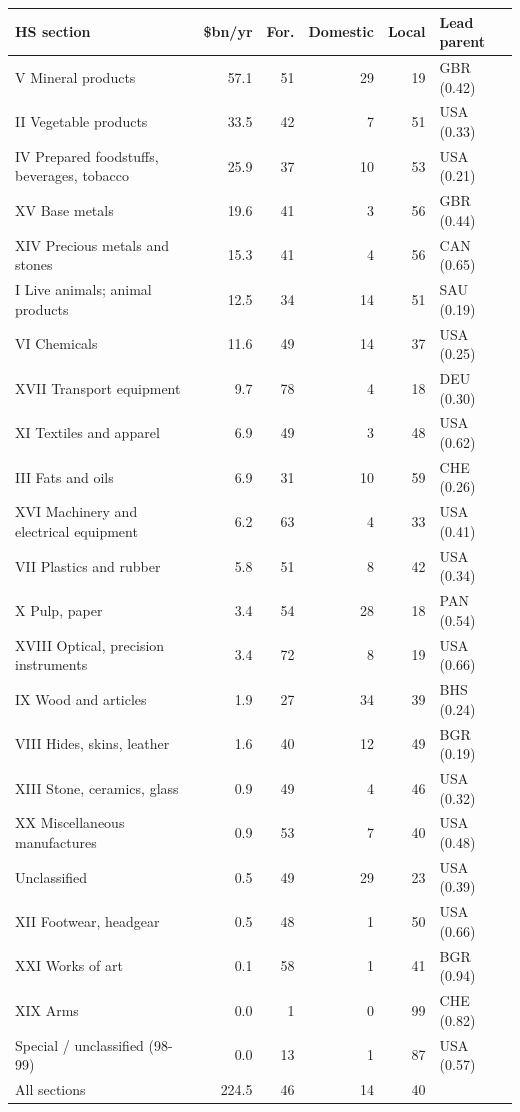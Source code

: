 \begin{tabular}{@{}p{7.2cm} r r r r l@{}}
\toprule
HS section & \$bn/yr & For. & Domestic & Local & Lead parent \\
\midrule
V Mineral products & 57.1 & 51 & 29 & 19 & GBR (0.42) \\
II Vegetable products & 33.5 & 42 & 7 & 51 & USA (0.33) \\
IV Prepared foodstuffs, beverages, tobacco & 25.9 & 37 & 10 & 53 & USA (0.21) \\
XV Base metals & 19.6 & 41 & 3 & 56 & GBR (0.44) \\
XIV Precious metals and stones & 15.3 & 41 & 4 & 56 & CAN (0.65) \\
I Live animals; animal products & 12.5 & 34 & 14 & 51 & SAU (0.19) \\
VI Chemicals & 11.6 & 49 & 14 & 37 & USA (0.25) \\
XVII Transport equipment & 9.7 & 78 & 4 & 18 & DEU (0.30) \\
XI Textiles and apparel & 6.9 & 49 & 3 & 48 & USA (0.62) \\
III Fats and oils & 6.9 & 31 & 10 & 59 & CHE (0.26) \\
XVI Machinery and electrical equipment & 6.2 & 63 & 4 & 33 & USA (0.41) \\
VII Plastics and rubber & 5.8 & 51 & 8 & 42 & USA (0.34) \\
X Pulp, paper & 3.4 & 54 & 28 & 18 & PAN (0.54) \\
XVIII Optical, precision instruments & 3.4 & 72 & 8 & 19 & USA (0.66) \\
IX Wood and articles & 1.9 & 27 & 34 & 39 & BHS (0.24) \\
VIII Hides, skins, leather & 1.6 & 40 & 12 & 49 & BGR (0.19) \\
XIII Stone, ceramics, glass & 0.9 & 49 & 4 & 46 & USA (0.32) \\
XX Miscellaneous manufactures & 0.9 & 53 & 7 & 40 & USA (0.48) \\
Unclassified & 0.5 & 49 & 29 & 23 & USA (0.39) \\
XII Footwear, headgear & 0.5 & 48 & 1 & 50 & USA (0.66) \\
XXI Works of art & 0.1 & 58 & 1 & 41 & BGR (0.94) \\
XIX Arms & 0.0 & 1 & 0 & 99 & CHE (0.82) \\
Special / unclassified (98-99) & 0.0 & 13 & 1 & 87 & USA (0.57) \\
\midrule
All sections & 224.5 & 46 & 14 & 40 & \\
\bottomrule
\end{tabular}
